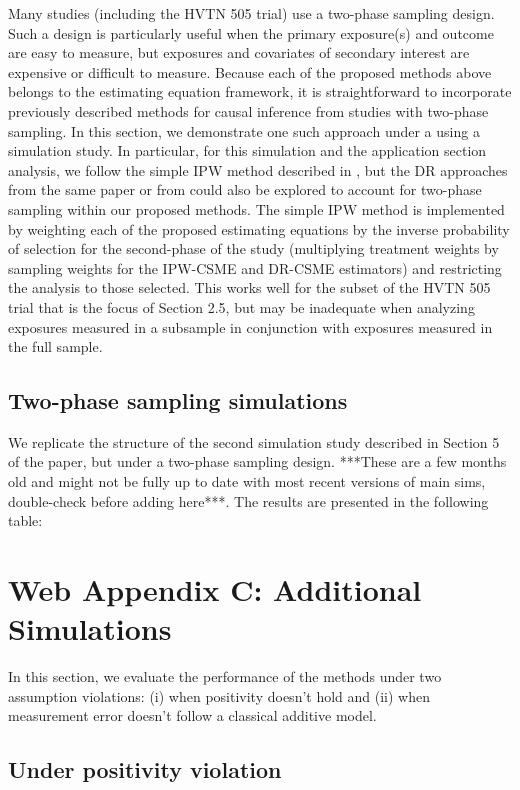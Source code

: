 \documentclass[12pt]{article}
\begin{document}
Many studies (including the HVTN 505 trial) use a two-phase sampling design. Such a design is particularly useful when the primary exposure(s) and outcome are easy to measure, but exposures and covariates of secondary interest are expensive or difficult to measure. Because each of the proposed methods above belongs to the estimating equation framework, it is straightforward to incorporate previously described methods for causal inference from studies with two-phase sampling. In this section, we demonstrate one such approach under a using a simulation study. In particular, for this simulation and the application section analysis, we follow the simple IPW method described in \citet{wang2009}, but the DR approaches from the same paper or from \citet{rose2011} could also be explored to account for two-phase sampling within our proposed methods. The simple IPW method is implemented by weighting each of the proposed estimating equations by the inverse probability of selection for the second-phase of the study (multiplying treatment weights by sampling weights for the IPW-CSME and DR-CSME estimators) and restricting the analysis to those selected. This works well for the subset of the HVTN 505 trial that is the focus of Section 2.5, but may be inadequate when analyzing exposures measured in a subsample in conjunction with exposures measured in the full sample.

\subsection{Two-phase sampling simulations}

We replicate the structure of the second simulation study described in Section 5 of the paper, but under a two-phase sampling design. ***These are a few months old and might not be fully up to date with most recent versions of main sims, double-check before adding here***. The results are presented in the following table:

\section{Web Appendix C: Additional Simulations}

In this section, we evaluate the performance of the methods under two assumption violations: (i) when positivity doesn't hold and (ii) when measurement error doesn't follow a classical additive model.

\subsection{Under positivity violation}
\end{document}
